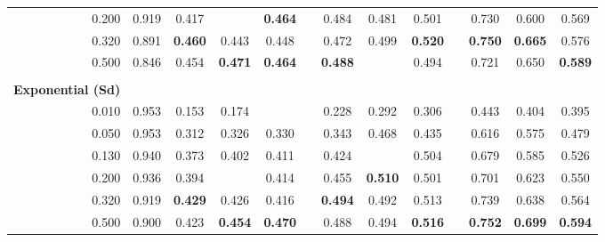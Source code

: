 \begin{table}[htb]
\begin{tabular}{rcccccccccccc}
    0.200 & 0.919 & 0.417 &       & \textbf{0.464} &       & 0.484 & 0.481 & 0.501 &       & 0.730 & 0.600 & 0.569 \\
    0.320 & 0.891 & \textbf{0.460} & 0.443 & 0.448 &       & 0.472 & 0.499 & \textbf{0.520} &       & \textbf{0.750} & \textbf{0.665} & 0.576 \\
    0.500 & 0.846 & 0.454 & \textbf{0.471} & \textbf{0.464} &       & \textbf{0.488} &       & 0.494 &       & 0.721 & 0.650 & \textbf{0.589} \\
          &       &       &       &       &       &       &       &       &       &       &       &  \\
    \textbf{Exponential (Sd)} &       &       &       &       &       &       &       &       &       &       &       &  \\
    \midrule
    0.010 & 0.953 & 0.153 & 0.174 &       &       & 0.228 & 0.292 & 0.306 &       & 0.443 & 0.404 & 0.395 \\
    0.050 & 0.953 & 0.312 & 0.326 & 0.330 &       & 0.343 & 0.468 & 0.435 &       & 0.616 & 0.575 & 0.479 \\
    0.130 & 0.940 & 0.373 & 0.402 & 0.411 &       & 0.424 &       & 0.504 &       & 0.679 & 0.585 & 0.526 \\
    0.200 & 0.936 & 0.394 &       & 0.414 &       & 0.455 & \textbf{0.510} & 0.501 &       & 0.701 & 0.623 & 0.550 \\
    0.320 & 0.919 & \textbf{0.429} & 0.426 & 0.416 &       & \textbf{0.494} & 0.492 & 0.513 &       & 0.739 & 0.638 & 0.564 \\
    0.500 & 0.900 & 0.423 & \textbf{0.454} & \textbf{0.470} &       & 0.488 & 0.494 & \textbf{0.516} &       & \textbf{0.752} & \textbf{0.699} & \textbf{0.594} \\
    \bottomrule
    \end{tabular}%
\end{table}%


